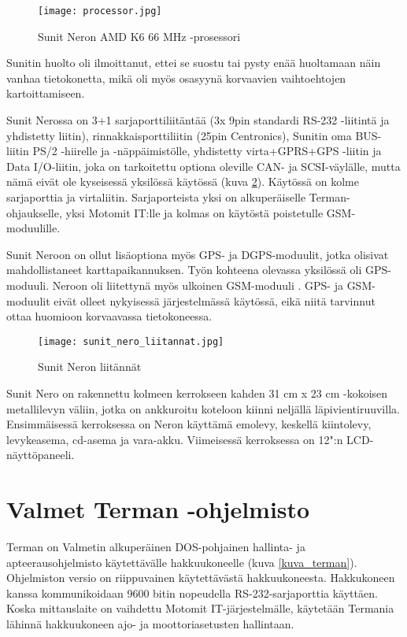 \begin{figure}[H]
\centering
\texttt{[image: processor.jpg]}
\caption{Sunit Neron AMD K6 66 MHz -prosessori}
\label{kuva_prossu}
\end{figure}

Sunitin huolto oli ilmoittanut, ettei se suostu tai pysty enää huoltamaan näin vanhaa tietokonetta, mikä oli myös osasyynä korvaavien vaihtoehtojen kartoittamiseen.

Sunit Nerossa on 3+1 sarjaporttiliitäntää (3x 9pin standardi RS-232 -liitintä ja yhdistetty liitin), rinnakkaisporttiliitin (25pin Centronics), Sunitin oma BUS-liitin PS/2 -hiirelle ja -näppäimistölle, yhdistetty virta+GPRS+GPS -liitin ja Data I/O-liitin, joka on tarkoitettu optiona oleville CAN- ja SCSI-väylälle, mutta nämä eivät ole kyseisessä yksilössä käytössä (kuva \ref{kuva_liitannat}).  Käytössä on kolme sarjaporttia ja virtaliitin. Sarjaporteista yksi on alkuperäiselle Terman-ohjaukselle, yksi Motomit IT:lle ja kolmas on käytöstä poistetulle GSM-moduulille.

Sunit Neroon on ollut lisäoptiona myös GPS- ja DGPS-moduulit, jotka olisivat mahdollistaneet karttapaikannuksen. Työn kohteena olevassa yksilössä oli GPS-moduuli. Neroon oli liitettynä myös ulkoinen GSM-moduuli \cite{nero:manual}. GPS- ja GSM-moduulit eivät olleet nykyisessä järjestelmässä käytössä, eikä niitä tarvinnut ottaa huomioon korvaavassa tietokoneessa.\newline\newline

\begin{figure}[H]
\centering
\texttt{[image: sunit\_nero\_liitannat.jpg]}
\caption{Sunit Neron liitännät}
\label{kuva_liitannat}
\end{figure}

Sunit Nero on rakennettu kolmeen kerrokseen kahden 31 cm x 23 cm -kokoisen metallilevyn väliin, jotka on ankkuroitu koteloon kiinni neljällä  läpivientiruuvilla. Ensimmäisessä kerroksessa on Neron käyttämä emolevy, keskellä kiintolevy, levykeasema, cd-asema ja vara-akku. Viimeisessä kerroksessa on 12":n LCD-näyttöpaneeli.

\section{Valmet Terman -ohjelmisto}
Terman on Valmetin alkuperäinen DOS-pohjainen hallinta- ja apteerausohjelmisto käytettävälle hakkuukoneelle (kuva \ref{kuva_terman}). Ohjelmiston versio on riippuvainen käytettävästä hakkuukoneesta. Hakkukoneen kanssa kommunikoidaan 9600 bitin nopeudella RS-232-sarjaporttia käyttäen. Koska mittauslaite on vaihdettu Motomit IT-järjestelmälle, käytetään Termania lähinnä hakkuukoneen ajo- ja moottoriasetusten hallintaan.
\newline\newline

